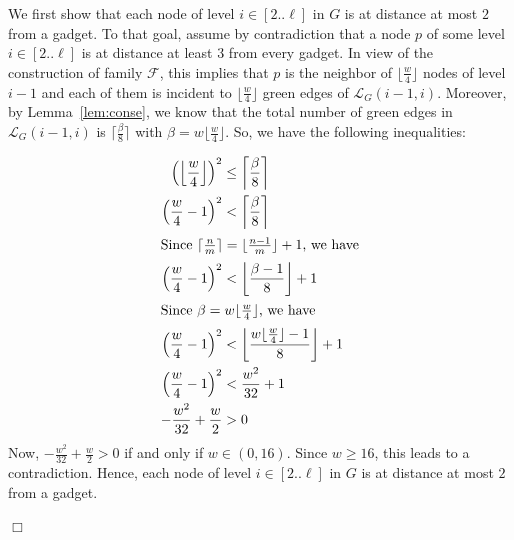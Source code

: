 \documentclass[11pt]{article}
\newcommand{\qed}{\hfill $\Box$ \bigbreak}
\newenvironment{proof}{\noindent {\bf Proof.}}{\qed}
\begin{document}
\begin{proof}
We first show that  each node of level $i \in [2..\ell]$ in $G$ is at distance at most $2$ from a gadget. To that goal, assume by contradiction that a node $p$ of some level $i \in [2..\ell]$ is at distance at least 3 from every gadget. In view of the construction of family $\mathcal{F}$, this implies that $p$ is the neighbor of $\lfloor\frac{w}{4}\rfloor$ nodes of level $i-1$ and each of them is incident to $\lfloor\frac{w}{4}\rfloor$ green edges of $\mathcal{L}_G(i-1,i)$. Moreover, by Lemma~\ref{lem:conse}, we know that the total number of green edges in $\mathcal{L}_G(i-1,i)$ is $\lceil\frac{\beta}{8}\rceil$ with $\beta=w\lfloor\frac{w}{4}\rfloor$. So, we have the following inequalities:

\begin{align*}
  \left(\left\lfloor\frac{w}{4}\right\rfloor\right)^2 & \leq \left\lceil\frac{\beta}{8}\right\rceil\\
  \left(\frac{w}{4}-1\right)^2 & < \left\lceil\frac{\beta}{8}\right\rceil\\
\intertext{Since $\lceil\frac{n}{m}\rceil = \lfloor\frac{n-1}{m}\rfloor+1$, we have}
\left(\frac{w}{4}-1\right)^2 & < \left\lfloor\frac{\beta-1}{8}\right\rfloor+1\\
\intertext{Since $\beta=w\lfloor\frac{w}{4}\rfloor$, we have}
\left(\frac{w}{4}-1\right)^2 & < \left\lfloor\frac{w\lfloor\frac{w}{4}\rfloor-1}{8}\right\rfloor+1\\
\left(\frac{w}{4}-1\right)^2 & < \frac{w^2}{32}+1\\
 -\frac{w^2}{32}+\frac{w}{2}  & > 0\\
\end{align*}
Now, $-\frac{w^2}{32}+\frac{w}{2} > 0$ if and only if $w \in (0,16)$. Since $w \geq 16$, this leads to a contradiction. Hence, each node of level $i \in [2..\ell]$ in $G$ is at distance at most $2$ from a gadget.
  

\end{proof}
\end{document}
